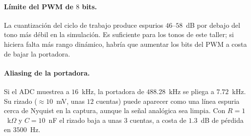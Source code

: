 \paragraph{Límite del PWM de $8$ bits.} La cuantización del ciclo de trabajo produce espurios $46$--$58$~dB por debajo del tono más débil en la simulación. Es suficiente para los tonos de este taller; si hiciera falta más rango dinámico, habría que aumentar los bits del PWM a costa de bajar la portadora.

\paragraph{Aliasing de la portadora.} Si el ADC muestrea a $16$~kHz, la portadora de $488.28$~kHz se pliega a $7.72$~kHz. Su rizado ($\approx 10$~mV, unas $12$ cuentas) puede aparecer como una línea espuria cerca de Nyquist en la captura, aunque la señal analógica sea limpia. Con $R = 1$~k$\Omega$ y $C = 10$~nF el rizado baja a unas $3$ cuentas, a costa de $1.3$~dB de pérdida en $3500$~Hz.

